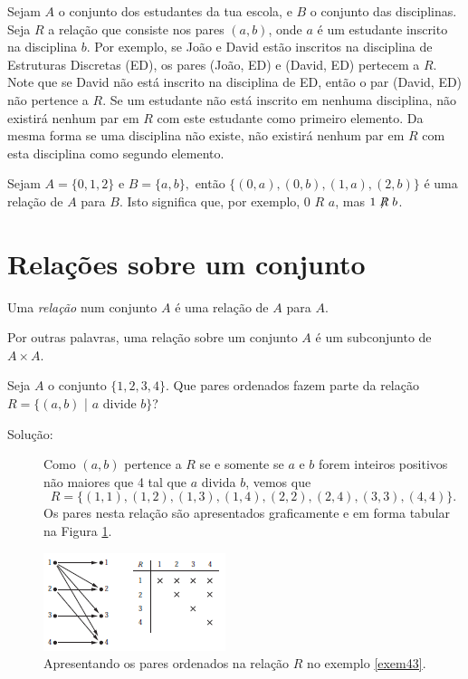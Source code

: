\label{exem41}
\begin{exmp}
Sejam $A$ o conjunto dos estudantes da tua escola, e $B$ o conjunto das
disciplinas. Seja $R$ a relação que consiste nos pares $(a,b)$, onde $a$ é um
estudante inscrito na disciplina $b$. Por exemplo, se João e David estão
inscritos na disciplina de Estruturas Discretas (ED), os pares (João, ED) e
(David, ED) pertecem a $R$. Note que se David não está inscrito na disciplina de
ED, então o par (David, ED) não pertence a $R$. Se um estudante não está
inscrito em nenhuma disciplina, não existirá nenhum par em $R$ com este
estudante como primeiro elemento. Da mesma forma se uma disciplina não existe,
não existirá nenhum par em $R$ com esta disciplina como segundo elemento.
\end{exmp}

\label{exem42}
\begin{exmp}
Sejam  $A = \{0,1,2\}$ e $B = \{a,b\},$ então $\{(0,a), (0,b), (1,a), (2,b)\}$ é
uma relação de $A$ para $B$. Isto significa que, por exemplo, $0$ $R$ $a$, mas
$1 \centernot{R} b$.
\end{exmp}

\section{Relações sobre um conjunto}

\label{def42}
\begin{defn}
Uma \emph{relação} num conjunto $A$ é uma relação de $A$ para $A$.
\end{defn}

Por outras palavras, uma relação sobre um conjunto $A$ é um subconjunto de $A
\times A$.

\label{exem43}
\begin{exmp}
Seja $A$ o conjunto $\{1,2,3,4\}$. Que pares ordenados fazem parte da relação $R
= \{(a,b)$ | $a$ divide $b\}$?
	\begin{description}
	\item[Solução:]Como $(a,b)$ pertence a $R$ se e somente se $a$ e $b$ forem
	inteiros positivos não maiores que 4 tal que $a$ divida $b$, vemos que
	\[R=\{(1,1), (1,2), (1,3), (1,4), (2,2), (2,4), (3,3), (4,4)\}.\] Os pares
	nesta relação são apresentados graficamente e em forma tabular na Figura
	\ref{fig41}.
	\end{description}
\end{exmp}

\begin{figure}[H]
	\centering
	\includegraphics[scale=2.5]{chapter/imagens/41}
	\caption{Apresentando os pares ordenados na relação $R$ no exemplo
	\ref{exem43}.}
	\label{fig41}
\end{figure}


